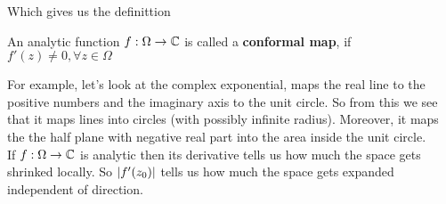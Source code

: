 Which gives us the definittion
\begin{definition}
	An analytic function $f: \Omega \to \mathbb{C}$ is called a \textbf{conformal map}, if $f'(z) \neq 0, \forall z \in \Omega$
\end{definition}

For example, let's look at the complex exponential, maps the real line to the positive numbers and the imaginary axis to the unit circle. So from this we see that it maps lines into circles (with possibly infinite radius). Moreover, it maps the the half plane with negative real part into the area inside the unit circle.\\

If $f: \Omega \to \mathbb{C}$ is analytic then its derivative tells us how much the space gets shrinked locally. So $\vert f'(z_0)\vert$ tells us how much the space gets expanded independent of direction.







